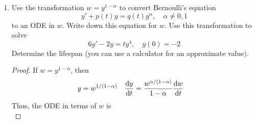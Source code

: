 \documentclass[../psets.tex]{subfiles}
\begin{document}
\begin{enumerate}
\begin{proof}
\begin{equation*}
            \dv{w}{t} = \frac{(-4w^{-1}-w)-w}{t}
        \end{equation*}
        Transforming the initial condition as well gives
        \begin{equation*}
            w(2) = \frac{y(2)}{2} = -\frac{7}{2}
        \end{equation*}
        We can simplify and solve the above as follows.
        \begin{align*}
            \frac{\dd{w}}{-4w^{-1}-2w} &= \frac{\dd{t}}{t}\\
            -\frac{1}{4}\int_{-7/2}^w\frac{2v\dd{v}}{v^2+2} &= \int_2^t\frac{\dd\tau}{\tau}\\
            -\frac{1}{4}\left[ \ln(w^2+2)-\ln(14.25) \right] &= \ln(\frac{t}{2})\\
            w &= \pm\frac{1}{t^2}\sqrt{228-2t^4}\\
            \Aboxed{y(t) &= -\frac{1}{t}\sqrt{228-2t^4}}
        \end{align*}
        Note that we pick the negative in the final step to fit the initial condition.\par
        The lifespan of $y(t)$ can be determined by calculating when $228-2t^4=0$. This occurs such that the lifespan is approximately
        \begin{equation*}
            \boxed{[0,3.27]}
        \end{equation*}
    \end{proof}
    \item Use the transformation $w=y^{1-\alpha}$ to convert Bernoulli's equation
    \begin{equation*}
        y'+p(t)y = q(t)y^\alpha
        ,\quad
        \alpha\neq 0,1
    \end{equation*}
    to an ODE in $w$. Write down this equation for $w$. Use this transformation to solve
    \begin{equation*}
        6y'-2y = ty^4
        ,\quad
        y(0) = -2
    \end{equation*}
    Determine the lifespan (you can use a calculator for an approximate value).
    \begin{proof}
        If $w=y^{1-\alpha}$, then
        \begin{align*}
            y &= w^{1/(1-\alpha)}&
            \dv{y}{t} &= \frac{w^{\alpha/(1-\alpha)}}{1-\alpha}\dv{w}{t}
        \end{align*}
        Thus, the ODE in terms of $w$ is
        \begin{equation*}

\end{equation*}
\end{proof}
\end{enumerate}
\end{document}
